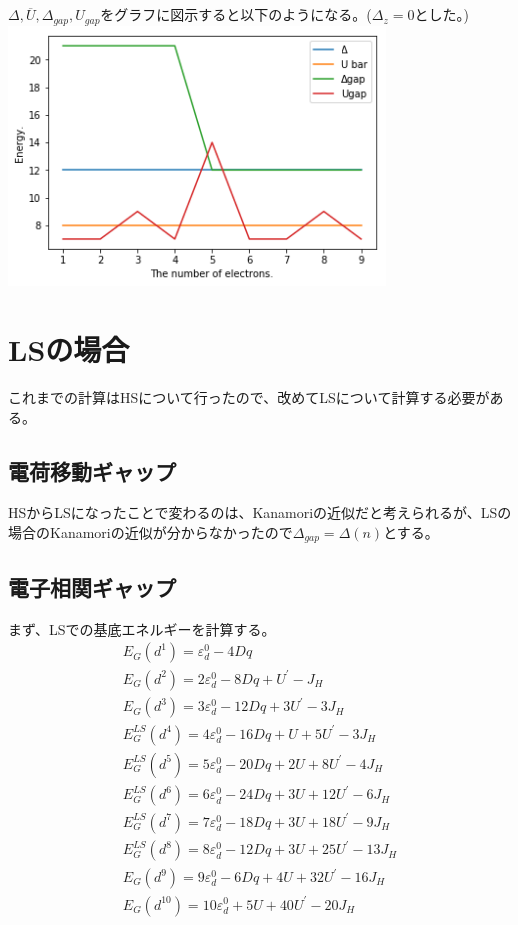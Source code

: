 \documentclass{jsarticle}
\begin{document}
\newpage

\subsection{}
$\Delta, \overline{U}, \Delta_{gap}, U_{gap}$をグラフに図示すると以下のようになる。($\Delta _z = 0$とした。) \\
\includegraphics[width=10cm]{graph01.png}

\section{LSの場合}
これまでの計算はHSについて行ったので、改めてLSについて計算する必要がある。
\subsection{電荷移動ギャップ}
HSからLSになったことで変わるのは、Kanamoriの近似だと考えられるが、LSの場合のKanamoriの近似が分からなかったので$\Delta _{gap} = \Delta(n)$とする。

\subsection{電子相関ギャップ}
まず、LSでの基底エネルギーを計算する。
\begin{eqnarray}
  E_G(d^1) = \varepsilon_d^0 - 4Dq \nonumber \\
  E_G(d^2) = 2\varepsilon_d^0 - 8Dq + U^{\prime} - J_H \nonumber \\
  E_G(d^3) = 3\varepsilon_d^0 - 12Dq + 3U^{\prime} - 3J_H \nonumber \\
  E_G^{LS}(d^4) = 4\varepsilon_d^0 - 16Dq + U + 5U^{\prime} - 3J_H \nonumber \\
  E_G^{LS}(d^5) = 5\varepsilon_d^0 - 20Dq + 2U + 8U^{\prime} - 4J_H \nonumber \\
  E_G^{LS}(d^6) = 6\varepsilon_d^0 - 24Dq + 3U + 12U^{\prime} - 6J_H \nonumber \\
  E_G^{LS}(d^7) = 7\varepsilon_d^0 - 18Dq + 3U + 18U^{\prime} - 9J_H \nonumber \\
  E_G^{LS}(d^8) = 8\varepsilon_d^0 - 12Dq + 3U + 25U^{\prime} - 13J_H \nonumber \\
  E_G(d^9) = 9\varepsilon_d^0 - 6Dq + 4U + 32U^{\prime} - 16J_H \nonumber \\
  E_G(d^10) = 10\varepsilon_d^0 + 5U + 40U^{\prime} - 20J_H \nonumber
\end{eqnarray}
\end{document}
